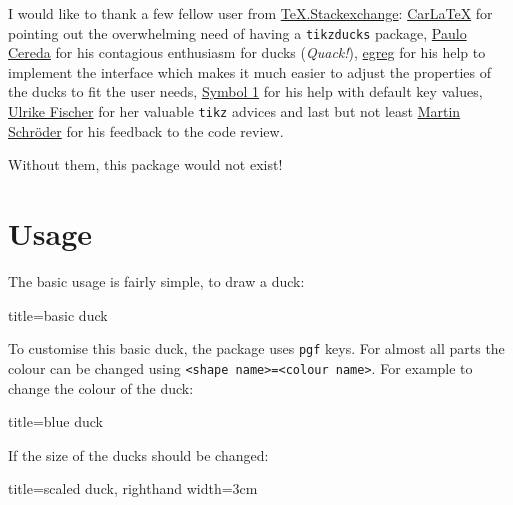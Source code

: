 \documentclass{ltxdockit}
\newcommand{\tikzducks}{\texttt{tikzducks}\xspace}
\begin{document}
I would like to thank a few fellow user from \href{https://tex.stackexchange.com/}{TeX.Stackexchange}: \href{https://tex.stackexchange.com/users/101651/carlatex}{CarLaTeX} for pointing out the overwhelming need of having a \tikzducks package,
\href{https://tex.stackexchange.com/users/3094/paulo-cereda}{Paulo Cereda} for his contagious enthusiasm for ducks (\emph{Quack!}),
\href{https://tex.stackexchange.com/users/4427/egreg}{egreg} for his help to implement the \texttt{\tikzset{}} interface which makes it much easier to adjust the properties of the ducks to fit the user needs, \href{https://tex.stackexchange.com/users/51022/symbol-1}{Symbol 1} for his help with default key values, \href{https://tex.stackexchange.com/users/2388/ulrike-fischer}{Ulrike Fischer} for her valuable \texttt{tikz} advices and last but not least \href{https://tex.stackexchange.com/users/5763/martin-schr%c3%b6der}{Martin Schr\"oder} for his feedback to the code review.

\bigskip\noindent
Without them, this package would not exist!

\newpage
\section{Usage}

The basic usage is fairly simple, to draw a duck:
\begin{tcblisting}{title={basic duck}}
\begin{tikzpicture}
	\duck
\end{tikzpicture}
\end{tcblisting}

To customise this basic duck, the package uses \texttt{pgf} keys. For almost all parts the colour can be changed using \verb|<shape name>=<colour name>|. For example to change the colour of the duck:
\begin{tcblisting}{title={blue duck}}
\begin{tikzpicture}
	\duck[body=blue]
\end{tikzpicture}
\end{tcblisting}

If the size of the ducks should be changed:
\begin{tcblisting}{title={scaled duck},	righthand width=3cm}
\begin{tikzpicture}[scale=0.6]
	\duck
	\begin{scope}[xshift=90pt, scale=.3, yshift=150pt]
		\duck
	\end{scope}
	\begin{scope}[xshift=60pt, scale=.3, yshift=100pt]
		\duck
	\end{scope}
	\begin{scope}[xshift=80pt, scale=.3, yshift=50pt]
		\duck
	\end{scope}		
\end{tikzpicture}
\end{tcblisting}
\end{document}

